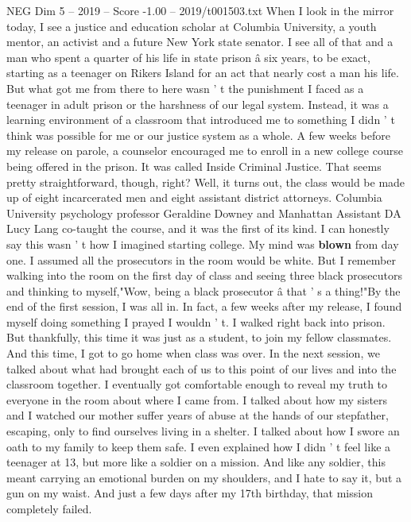 \begin{textsample}{NEG Dim 5 – 2019 – Score -1.00 – 2019/t001503.txt}  \label{ex:f5_neg_005}
When I look in the mirror today, I see a justice and education scholar at Columbia University, a youth mentor, an activist and a future New York state senator.
I see all of that and a man who spent a quarter of his life in state prison â six years, to be exact, starting as a teenager on Rikers Island for an act that nearly cost a man his life.
But what got me from there to here wasn ' t the punishment I faced as a teenager in adult prison or the harshness of our legal system.
Instead, it was a learning environment of a classroom that introduced me to something I didn ' t think was possible for me or our justice system as a whole.
A few weeks before my release on parole, a counselor encouraged me to enroll in a new college course being offered in the prison.
It was called Inside Criminal Justice.
That seems pretty straightforward, though, right?
Well, it turns out, the class would be made up of eight incarcerated men and eight assistant district attorneys.
Columbia University psychology professor Geraldine Downey and Manhattan Assistant DA Lucy Lang co-taught the course, and it was the first of its kind.
I can honestly say this wasn ' t how I imagined starting college.
My mind was \textbf{blown} from day one.
I assumed all the prosecutors in the room would be white.
But I remember walking into the room on the first day of class and seeing three black prosecutors and thinking to myself,"Wow, being a black prosecutor â that ' s a thing!"By the end of the first session, I was all in.
In fact, a few weeks after my release, I found myself doing something I prayed I wouldn ' t.
I walked right back into prison.
But thankfully, this time it was just as a student, to join my fellow classmates.
And this time, I got to go home when class was over.
In the next session, we talked about what had brought each of us to this point of our lives and into the classroom together.
I eventually got comfortable enough to reveal my truth to everyone in the room about where I came from.
I talked about how my sisters and I watched our mother suffer years of abuse at the hands of our stepfather, escaping, only to find ourselves living in a shelter.
I talked about how I swore an oath to my family to keep them safe.
I even explained how I didn ' t feel like a teenager at 13, but more like a soldier on a mission.
And like any soldier, this meant carrying an emotional burden on my shoulders, and I hate to say it, but a gun on my waist.
And just a few days after my 17th birthday, that mission completely failed.

\end{textsample}
